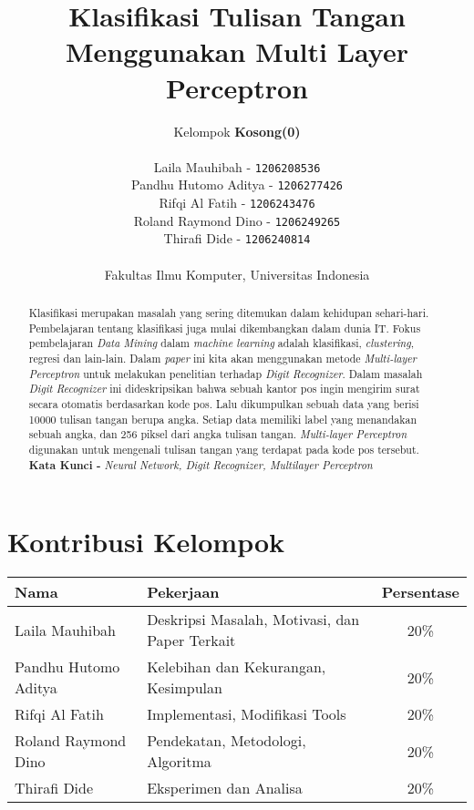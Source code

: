 \documentclass{article}
\begin{document}
\title{Klasifikasi Tulisan Tangan Menggunakan Multi Layer Perceptron}
\author{
	Kelompok \textbf{Kosong(0)} \\
	~\\
	Laila Mauhibah - \texttt{1206208536} \\
	Pandhu Hutomo Aditya - \texttt{1206277426} \\
	Rifqi Al Fatih - \texttt{1206243476} \\
	Roland Raymond Dino - \texttt{1206249265} \\
	Thirafi Dide - \texttt{1206240814} \\
	~\\
	Fakultas Ilmu Komputer, Universitas Indonesia
}

\maketitle

\begin{abstract}
Klasifikasi merupakan masalah yang sering ditemukan dalam kehidupan sehari-hari. Pembelajaran tentang klasifikasi juga mulai dikembangkan dalam dunia IT. Fokus pembelajaran \textit{Data Mining} dalam \textit{machine learning} adalah klasifikasi, \textit{clustering}, regresi dan lain-lain. Dalam \textit{paper} ini kita akan menggunakan metode \textit{Multi-layer Perceptron} untuk melakukan penelitian terhadap \textit{Digit Recognizer}. Dalam masalah \textit{Digit Recognizer} ini dideskripsikan bahwa sebuah kantor pos ingin mengirim surat secara otomatis berdasarkan kode pos. Lalu dikumpulkan sebuah data yang berisi 10000 tulisan tangan berupa angka. Setiap data memiliki label yang menandakan sebuah angka, dan 256 piksel dari angka tulisan tangan. \textit{Multi-layer Perceptron} digunakan untuk mengenali tulisan tangan yang terdapat pada kode pos tersebut.
~\\
\noindent \textbf{Kata Kunci - }\textit{Neural Network, Digit Recognizer, Multilayer Perceptron}
\end{abstract}

\pagebreak

\section*{Kontribusi Kelompok}
\begin{center}
  \begin{tabular}{ | l | l | c | }
  	\hline
  	Nama 					& Pekerjaan 										& Persentase \\
    \hline
    Laila Mauhibah 			& Deskripsi Masalah, Motivasi, dan Paper Terkait 	& 20\% \\ 
    Pandhu Hutomo Aditya 	& Kelebihan dan Kekurangan, Kesimpulan 				& 20\% \\ 
    Rifqi Al Fatih 			& Implementasi, Modifikasi Tools 					& 20\% \\
    Roland Raymond Dino 	& Pendekatan, Metodologi, Algoritma 				& 20\% \\
	Thirafi Dide 			& Eksperimen dan Analisa 							& 20\% \\
    \hline
  \end{tabular}
\end{center}
\end{document}

